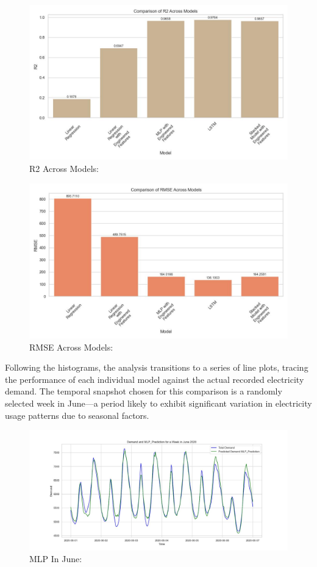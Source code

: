 \documentclass[
]{article}
\begin{document}
\begin{figure}
\centering
\includegraphics{img/r2_comparison_across_models.jpg}
\caption{R2 Across Models:}
\end{figure}

\begin{figure}
\centering
\includegraphics{img/rmse_comparison_across_models.jpg}
\caption{RMSE Across Models:}
\end{figure}

Following the histograms, the analysis transitions to a series of line
plots, tracing the performance of each individual model against the
actual recorded electricity demand. The temporal snapshot chosen for
this comparison is a randomly selected week in June---a period likely to
exhibit significant variation in electricity usage patterns due to
seasonal factors.

\begin{figure}
\centering
\includegraphics{img/mlp-prediction_june_2020.jpg}
\caption{MLP In June:}
\end{figure}
\end{document}
